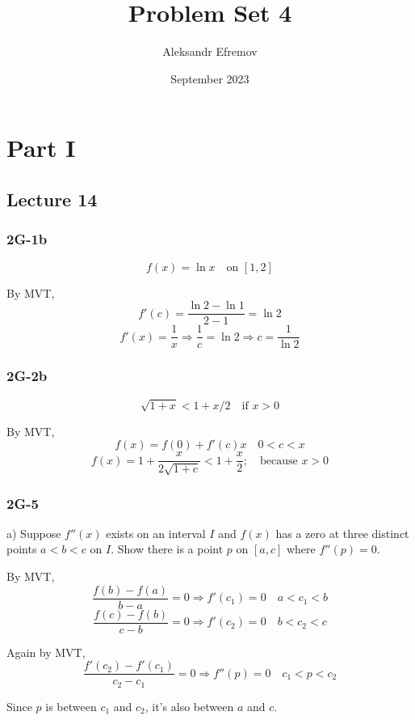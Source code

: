 \documentclass{article}
\title{Problem Set 4}
\author{Aleksandr Efremov}
\date{September 2023}
\begin{document}
\maketitle

\section{Part I}
\subsection{Lecture 14}

\subsubsection{2G-1b}
\[ f(x) = \ln{x} \quad \text{on } [1, 2] \]
\par By MVT,
\[ f'(c) = \frac{\ln{2} - \ln{1}}{2 - 1} = \ln{2} \]
\[ f'(x) = \frac{1}{x} \Rightarrow \frac{1}{c} = \ln{2} \Rightarrow c = \frac{1}{\ln{2}} \]

\subsubsection{2G-2b}
\[ \sqrt{1 + x} < 1 + x/2 \quad \text{if } x > 0 \]

By MVT,
\[ f(x) = f(0) + f'(c)x \quad 0 < c < x\]
\[ f(x) = 1 + \frac{x}{2\sqrt{1 + c}} < 1 + \frac{x}{2}; \quad \text{because } x > 0 \]

\subsubsection{2G-5}
\begin{tcolorbox}
    a) Suppose $f''(x)$ exists on an interval $I$ and $f(x)$ has a zero at three distinct points $a < b< c$ on $I$. Show there is a point $p$ on $[a, c]$ where $f''(p) = 0$.
\end{tcolorbox}
\par By MVT,
\[ \frac{f(b)-f(a)}{b-a} = 0 \Rightarrow f'(c_1) = 0 \quad a < c_1 < b \]
\[ \frac{f(c)-f(b)}{c-b} = 0 \Rightarrow f'(c_2) = 0 \quad b < c_2 < c \]
\par Again by MVT,
\[ \frac{f'(c_2)-f'(c_1)}{c_2 - c_1} = 0 \Rightarrow f''(p) = 0 \quad c_1 < p < c_2 \]
\par Since $p$ is between $c_1$ and $c_2$, it's also between $a$ and $c$.
\end{document}
